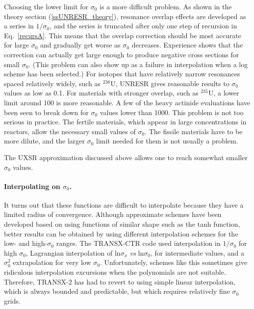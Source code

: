 Choosing the lower limit for $\sigma_0$
is a more difficult problem.  As shown in the theory section
(\ref{ssUNRESR_theory}),
resonance overlap effects are developed as a series in $1/\sigma_0$,
and the series is truncated after only one step of recursion
in Eq.~\ref{recursA}.  This means that the overlap correction
should be most accurate for large $\sigma_0$ and gradually get worse
as $\sigma_0$ decreases.  Experience shows that the correction can
actually get large enough to produce negative cross sections for
small $\sigma_0$.  (This problem can also show up as a failure in
interpolation when a log scheme has been selected.)  For isotopes that
have relatively narrow resonances spaced relatively widely, such as
$^{238}$U, UNRESR gives reasonable results to $\sigma_0$ values
as low as 0.1.  For materials with stronger overlap, such as
$^{235}$U, a lower limit around 100 is more reasonable.  A few
of the heavy actinide evaluations have been seen to break
down for $\sigma_0$ values lower than 1000.  This problem is not
too serious in practice.  The fertile materials, which appear
in large concentrations in reactors, allow the necessary small
values of $\sigma_0$.  The fissile materials have to be more
dilute, and the larger $\sigma_0$ limit needed for them is not
usually a problem.

The UXSR approximation discussed above allows one to reach
somewhat smaller $\sigma_0$ values.

\paragraph{Interpolating on $\sigma_0$.}
It turns out that these functions are difficult to interpolate because
they have a limited radius of convergence.   Although approximate
schemes have been developed based on using functions of similar
shape such as the tanh function\cite{Kidman}, better
results can be obtained by using different interpolation schemes for the
low- and high-$\sigma_0$ ranges.  The TRANSX-CTR
code\cite{TRANSX} used interpolation in
$1/\sigma_0$ for high $\sigma_0$, Lagrangian interpolation of
ln$\sigma_x$ {\it vs} ln$\sigma_0$, for intermediate values, and
a $\sigma_0^2$ extrapolation for very low $\sigma_0$.  Unfortunately,
schemes like this sometimes give ridiculous interpolation excursions
when the polynomials are not suitable.  Therefore,
TRANSX-2\cite{TRANSX2} has had to revert to using
simple linear interpolation, which is always bounded and
predictable, but which requires relatively fine $\sigma_0$ grids.

